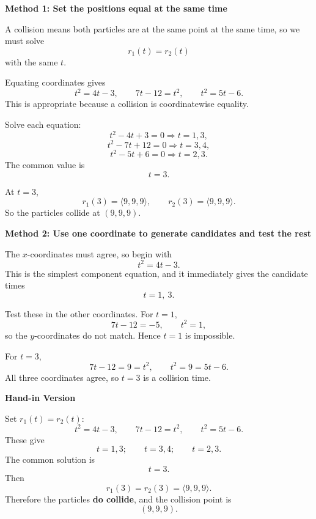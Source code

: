\documentclass[a4paper,12pt,twocolumn]{article}
\newenvironment{solutionbox}{\begin{framed}}{\end{framed}}
\begin{document}
\begin{solutionbox}
\textbf{Method 1: Set the positions equal at the same time}

\begin{steps}
\item A collision means both particles are at the same point at the same time, so we must solve
\[
r_1(t)=r_2(t)
\]
with the same \(t\).

\item Equating coordinates gives
\[
t^2=4t-3,\qquad
7t-12=t^2,\qquad
t^2=5t-6.
\]
This is appropriate because a collision is coordinatewise equality.

\item Solve each equation:
\[
t^2-4t+3=0 \Rightarrow t=1,3,
\]
\[
t^2-7t+12=0 \Rightarrow t=3,4,
\]
\[
t^2-5t+6=0 \Rightarrow t=2,3.
\]
The common value is
\[
t=3.
\]

\item At \(t=3\),
\[
r_1(3)=\langle 9,9,9\rangle,
\qquad
r_2(3)=\langle 9,9,9\rangle.
\]
So the particles collide at \((9,9,9)\).
\end{steps}
\end{solutionbox}

\begin{solutionbox}
\textbf{Method 2: Use one coordinate to generate candidates and test the rest}

\begin{steps}
\item The \(x\)-coordinates must agree, so begin with
\[
t^2=4t-3.
\]
This is the simplest component equation, and it immediately gives the candidate times
\[
t=1,\ 3.
\]

\item Test these in the other coordinates. For \(t=1\),
\[
7t-12=-5,\qquad t^2=1,
\]
so the \(y\)-coordinates do not match. Hence \(t=1\) is impossible.

\item For \(t=3\),
\[
7t-12=9=t^2,\qquad t^2=9=5t-6.
\]
All three coordinates agree, so \(t=3\) is a collision time.
\end{steps}
\end{solutionbox}

\begin{solutionbox}
\textbf{Hand-in Version}

Set \(r_1(t)=r_2(t)\):
\[
t^2=4t-3,\qquad 7t-12=t^2,\qquad t^2=5t-6.
\]
These give
\[
t=1,3;\qquad t=3,4;\qquad t=2,3.
\]
The common solution is
\[
\boxed{t=3.}
\]
Then
\[
r_1(3)=r_2(3)=\langle 9,9,9\rangle.
\]
Therefore the particles \textbf{do collide}, and the collision point is
\[
\boxed{(9,9,9).}
\]
\end{solutionbox}
\end{document}
